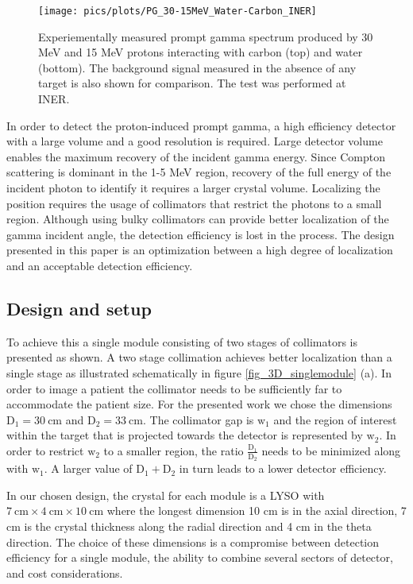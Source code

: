 \documentclass[11pt,a4paper]{article}
\begin{document}
\begin{figure}[h] 
\centering 
\texttt{[image: pics/plots/PG\_30-15MeV\_Water-Carbon\_INER]}
\caption{Experiementally measured  prompt gamma spectrum produced by 30 MeV and 15 MeV protons interacting with carbon (top) and water (bottom). The background signal measured in the absence of any  target is also shown for comparison. The test was performed at INER.}
\label{fig_3DPG_Espectrum_Water-C}
\end{figure}


In order to detect the proton-induced prompt gamma, a high efficiency detector with a large volume and a good resolution is required. Large detector volume enables the maximum recovery of the incident gamma energy. Since Compton scattering is dominant in the 1-5 MeV  region, recovery of the full energy of the incident photon to identify it requires a larger crystal volume. Localizing the position requires the usage of collimators that restrict the photons to a small region. Although using bulky collimators can provide better localization of the gamma incident angle, the detection efficiency is lost in the process. The design presented in this paper is an optimization between a high degree of localization and an acceptable detection efficiency. 

\subsection{Design and setup}\label{subsection_3DPG_design}

To achieve  this a single module consisting of two stages  of collimators is presented as shown. A two stage collimation achieves better localization than a single stage as illustrated schematically  in figure \ref{fig_3D_singlemodule} (a). In order to image a patient the collimator needs to be sufficiently far to accommodate the patient size. For the presented work we chose the dimensions $\mathrm{D_1=30\ cm}$ and $\mathrm{D_2=33\ cm}$. The collimator gap is $\mathrm{w_1}$ and the region of interest within the target that is projected towards the detector is represented by $\mathrm{w_2}$. In order to restrict $\mathrm{w_2}$ to a smaller region, the ratio $\mathrm{\frac{D_1}{D_2}}$ needs to be minimized along with $\mathrm{w_1}$.
A larger value of $\mathrm{D_1+D_2}$ in turn leads to a lower detector efficiency. 

In our chosen design, the crystal for each module is a LYSO with $\mathrm{7\ cm\times 4\ cm \times 10\ cm}$ where the longest dimension 10 cm is in the axial direction, 7 cm is the crystal thickness along the radial direction and 4 cm in the theta direction. The choice of these dimensions is a compromise between detection efficiency for a single module, the ability to combine several sectors of detector, and cost considerations.  
\end{document}
